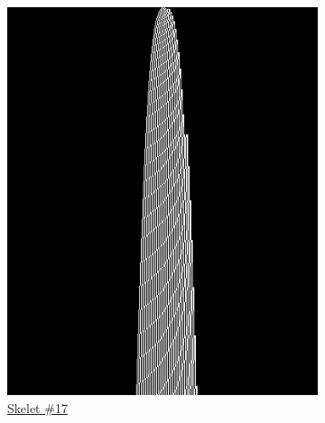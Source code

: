 \begin{figure}[h!]
\begin{minipage}{\textwidth}
\begin{subfigure}{0.3\textwidth}
            \includegraphics[width=\linewidth]{figures/sporadic-machines/sk17.png}
            \caption*{\href{https://bbchallenge.org/example2}{Skelet \#17}}
        \end{subfigure}
        \hfill
        \begin{subfigure}{0.3\textwidth}
            \centering

\end{subfigure}
\end{minipage}
\end{figure}
